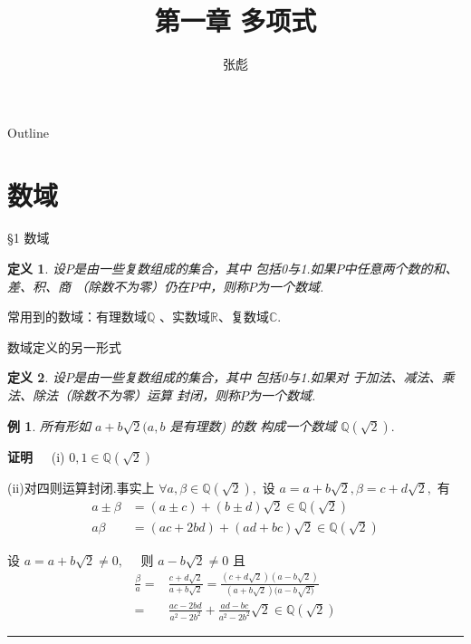 \documentclass[13pt,fontset=mac]{ctexbeamer}
\newtheorem{exa}{例}
\newtheorem*{defi}{定义}
\def\qed{\nopagebreak\hfill{\rule{4pt}{7pt}}\medbreak}
\def\pf{{\bf 证明~~ }}
\begin{document}
\title[]{第一章 \quad 多项式}
\author[]{{\large 张彪}\\  }

\date{}


\AtBeginSection[]
{
\setcounter{exa}{0}
\setcounter{equation}{0}
}


\begin{frame}
\maketitle
\end{frame}

\begin{frame}{Outline}
	\tableofcontents
\end{frame}

\section{数域}
\begin{frame}{\S 1    数域}

\begin{defi}
设$P$是由一些复数组成的集合，其中
	包括0与1.如果$P$中任意两个数的和、差、积、商
	（除数不为零）仍在$P$中，则称$P$为一个数域.
\end{defi}

   常用到的数域：有理数域$\mathbb{Q}$ 、实数域$\mathbb{R}$、复数域$\mathbb{C}$.
   
   \vspace{10pt}
数域定义的另一形式  
\begin{defi}
	设$P$是由一些复数组成的集合，其中
	包括0与1.如果对
	于加法、减法、乘法、除法（除数不为零）运算
	封闭，则称$P$为一个数域.
\end{defi}


\end{frame}


\begin{frame}
\begin{exa}
所有形如 $a+b \sqrt{2}(a ,b$ 是有理数) 的数 构成一个数域 $\mathbb{Q}(\sqrt{2}) .$
\end{exa} 

\pause
\pf (i) $0,1 \in \mathbb{Q}(\sqrt{2})$


(ii)对四则运算封闭.事实上 $\forall a, \beta \in \mathbb{Q}(\sqrt{2}),$ 设 $a=a+b \sqrt{2}, \beta=c+d \sqrt{2},$ 有
\begin{align*}
a \pm \beta & =(a \pm c)+(b \pm d) \sqrt{2} \in \mathbb{Q}(\sqrt{2})\\[6pt]
a \beta & =(a c+2 b d)+(a d+b c) \sqrt{2} \in \mathbb{Q}(\sqrt{2})
\end{align*}

设 $a=a+b \sqrt{2} \neq 0, \quad$ 则 $a-b \sqrt{2} \neq 0$ 且
\begin{align*}
\frac{\beta}{a}= & \frac{c+d \sqrt{2}}{a+b \sqrt{2}}=\frac{(c+d \sqrt{2})(a-b \sqrt{2})}{(a+b \sqrt{2})(a-b \sqrt{2)}}\\[6pt]
= & \frac{a c-2 b d}{a^{2}-2 b^{2}}+\frac{a d-b c}{a^{2}-2 b^{2}} \sqrt{2} \in \mathbb{Q}(\sqrt{2})
\end{align*}
\qed
\end{frame}
\end{document}
